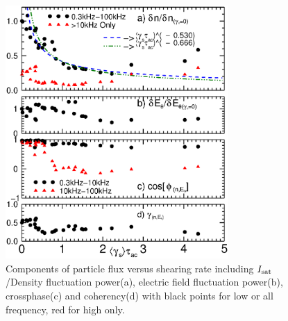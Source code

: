 \documentclass[aps,prl,amsmath,amssymb,reprint,superscriptaddress]{revtex4-1} %
\begin{document}
\begin{figure}[!htbp]
\centerline{
\includegraphics[width=8.5cm]{fluxcomps.eps}}
\caption{\label{fig:fluxcomps} Components of particle flux versus shearing rate including $I_{\rm sat}$/Density fluctuation power(a), electric field fluctuation power(b), crossphase(c) and coherency(d) with black points for low or all frequency, red for high only.}
\end{figure}

\end{document}
